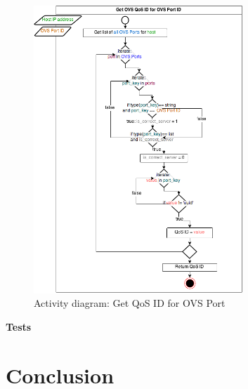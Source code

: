\begin{figure}[H]
\centering

\includegraphics[width=0.7\textwidth]{images/design/activity_get_qos_id_for_ovs_port}

\caption{Activity diagram: Get QoS ID for OVS Port}
\end{figure}


\textbf{Tests}


\section{Conclusion}